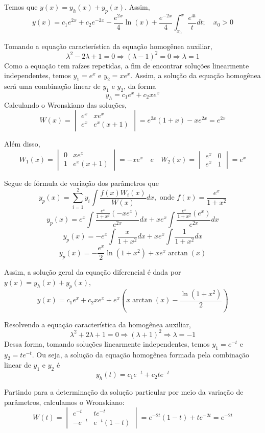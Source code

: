\documentclass[oneside,12pt,a4paper]{report}
\begin{document}
\begin{resolucao}
    Temos que $y(x)=y_h(x)+y_p(x)$. Assim,
    \[\boxed{y(x)=c_1e^{2x}+c_2e^{-2x}-\frac{e^{2x}}{4}\ln(x)+\frac{e^{-2x}}{4}\int_{x_0}^{x}\frac{e^{4t}}{t}dt;\quad x_0>0}\]

    \itemresolucao Tomando a equação característica da equação homogênea auxiliar, 
    \[\lambda^2-2\lambda+1=0\Rightarrow(\lambda-1)^2=0\Rightarrow\lambda=1\]
    Como a equação tem raízes repetidas, a fim de encontrar soluções linearmente independentes, temos $y_1=e^x$ e $y_2=xe^x$. Assim, a solução da equação homogênea será uma combinação linear de $y_1$ e $y_2$, da forma
    \[y_h=c_1e^x+c_2xe^x\]
    Calculando o Wronskiano das soluções,
    \[W(x)=\begin{vmatrix}
        e^{x} & xe^{x}\\
        e^{x} & e^{x}(x+1)
    \end{vmatrix}=e^{2x}(1+x)-xe^{2x}=e^{2x}\]

    Além disso,
    \[W_1(x)=\begin{vmatrix}
        0 & xe^{x}\\
        1 & e^{x}(x+1)
    \end{vmatrix}=-xe^{x}\quad e \quad W_2(x)=\begin{vmatrix}
        e^{x}  & 0\\
        e^{x} & 1
    \end{vmatrix}=e^{x}\]

    Segue de fórmula de variação dos parâmetros que
    \[y_p(x)=\sum_{i=1}^{2}y_i\int\frac{f(x)W_i(x)}{W(x)}dx, \text{ onde } f(x)=\frac{e^{x}}{1+x^2}\]
    \[y_p(x)=e^x\int\frac{\frac{e^x}{1+x^2}(-xe^x)}{e^{2x}}dx+xe^x\int\frac{\frac{e^x}{1+x^2}(e^x)}{e^{2x}}dx\]
    \[y_p(x)=-e^x\int\frac{x}{1+x^2}dx+xe^x\int\frac{1}{1+x^2}dx\]
    \[y_p(x)=-\frac{e^x}{2}\ln(1+x^2)+xe^x\arctan(x)\]

    Assim, a solução geral da equação diferencial é dada por $y(x)=y_h(x)+y_p(x)$,
    \[\boxed{y(x)=c_1e^x+c_2xe^x+e^x\left(x\arctan(x)-\frac{\ln(1+x^2)}{2}\right)}\]

    \itemresolucao Resolvendo a equação característica da homogênea auxiliar,
    \[\lambda^2+2\lambda+1=0\Rightarrow(\lambda+1)^2\Rightarrow\lambda=-1\]
    Dessa forma, tomando soluções linearmente independentes, temos $y_1=e^{-t}$ e $y_2=te^{-t}$. Ou seja, a solução da equação homogênea formada pela combinação linear de $y_1$ e $y_2$ é
    \[y_h(t)=c_1e^{-t}+c_2te^{-t}\]

    Partindo para a determinação da solução particular por meio da variação de parâmetros, calculamos o Wronskiano:
    \[W(t)=\begin{vmatrix}
        e^{-t} & te^{-t}\\
        -e^{-t} & e^{-t}(1-t)
    \end{vmatrix}=e^{-2t}(1-t)+te^{-2t}=e^{-2t}\]


\end{resolucao}
\end{document}
